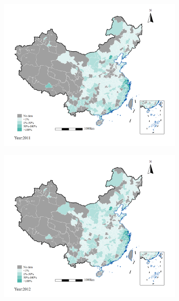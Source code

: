 \documentclass[12pt]{article}
\begin{document}
\begin{figure}[!htbp]
    \centering
    \begin{subfigure}{0.45\textwidth}
        \centering
        \includegraphics[width=\textwidth]{../Analysis/output/figure_immgrants_share_2011.png}
        \label{fig:2011}
    \end{subfigure}
    \hfill
    \begin{subfigure}{0.45\textwidth}
        \centering
        \includegraphics[width=\textwidth]{../Analysis/output/figure_immgrants_share_2012.png}

\end{subfigure}
\end{figure}
\end{document}
